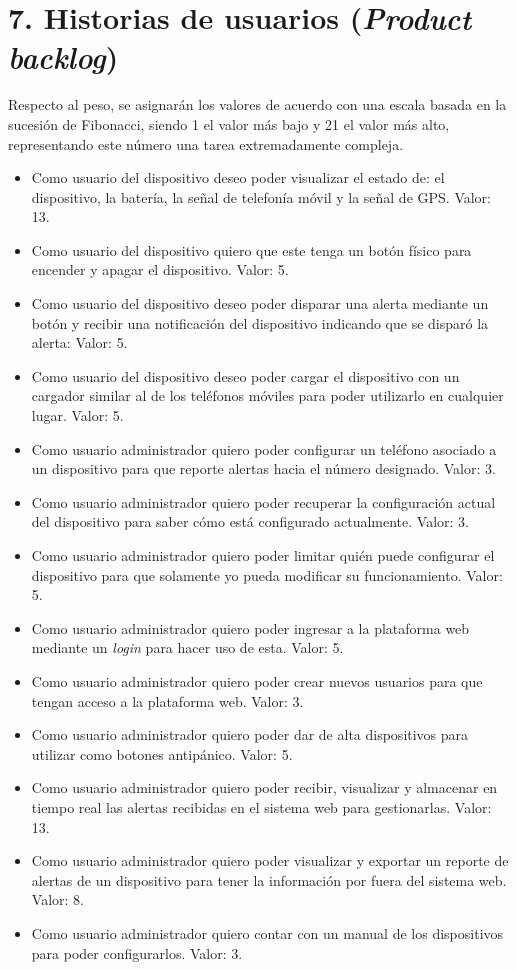 \documentclass[
11pt, %
]{charter}
\begin{document}
\section{7. Historias de usuarios (\textit{Product backlog})}
\label{sec:backlog}

Respecto al peso, se asignarán los valores de acuerdo con una escala basada en la sucesión de Fibonacci, siendo 1 el valor más bajo y 21 el valor más alto, representando este número una tarea extremadamente compleja.

\begin{itemize}
	\item Como usuario del dispositivo deseo poder visualizar el estado de: el dispositivo, la batería, la señal de telefonía móvil y la señal de GPS. Valor: 13.
	\item Como usuario del dispositivo quiero que este tenga un botón físico para encender y apagar el dispositivo. Valor: 5.
	\item Como usuario del dispositivo deseo poder disparar una alerta mediante un botón y recibir una notificación del dispositivo indicando que se disparó la alerta: Valor: 5.
	\item Como usuario del dispositivo deseo poder cargar el dispositivo con un cargador similar al de los teléfonos móviles para poder utilizarlo en cualquier lugar. Valor: 5.
	\item Como usuario administrador quiero poder configurar un teléfono asociado a un dispositivo para que reporte alertas hacia el número designado. Valor: 3.
	\item Como usuario administrador quiero poder recuperar la configuración actual del dispositivo para saber cómo está configurado actualmente. Valor: 3.
	\item Como usuario administrador quiero poder limitar quién puede configurar el dispositivo para que solamente yo pueda modificar su funcionamiento. Valor: 5.
	\item Como usuario administrador quiero poder ingresar a la plataforma web mediante un \textit{login} para hacer uso de esta. Valor: 5.
	\item Como usuario administrador quiero poder crear nuevos usuarios para que tengan acceso a la plataforma web. Valor: 3.
	\item Como usuario administrador quiero poder dar de alta dispositivos para utilizar como botones antipánico. Valor: 5.
	\item Como usuario administrador quiero poder recibir, visualizar y almacenar en tiempo real las alertas recibidas en el sistema web para gestionarlas. Valor: 13.
	\item Como usuario administrador quiero poder visualizar y exportar un reporte de alertas de un dispositivo para tener la información por fuera del sistema web. Valor: 8.
	\item Como usuario administrador quiero contar con un manual de los dispositivos para poder configurarlos. Valor: 3.

\end{itemize}
\end{document}
